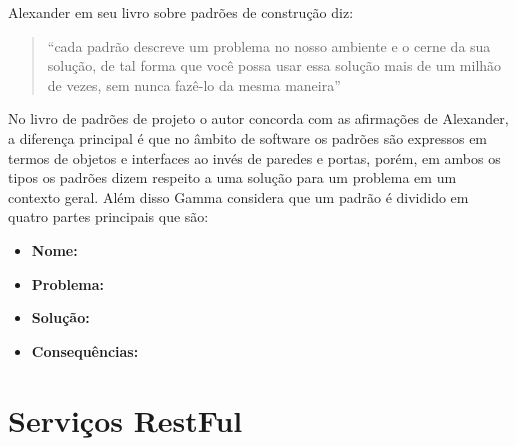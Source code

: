 Alexander em seu livro \cite{Alexander:1979} sobre padrões de construção diz:

\begin{quote}
	``cada padrão descreve um problema no nosso
ambiente e o cerne da sua solução, de tal forma que você possa usar essa solução mais
de um milhão de vezes, sem nunca fazê-lo da mesma maneira''
\end{quote}

No livro de padrões de projeto \cite{Gamma:Helm:Johnson:Vlissides:1995} o autor concorda com as afirmações de Alexander, a diferença principal é que no âmbito de software os padrões são expressos em termos de objetos e interfaces ao invés de paredes e portas, porém, em ambos os tipos os padrões dizem respeito a uma solução para um problema em um contexto geral. Além disso Gamma considera que um padrão é dividido em quatro partes principais que são:

\begin{itemize}
	\item \textbf{Nome:}
	\item \textbf{Problema:}
	\item \textbf{Solução:}
	\item \textbf{Consequências:}
\end{itemize}

\section{Serviços RestFul}